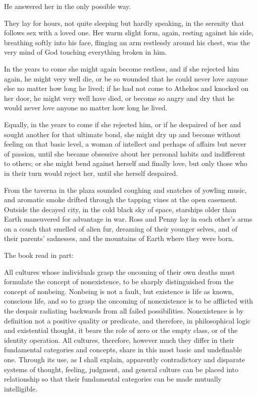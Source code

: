 \documentclass[english,11pt,letterpaper,onecolumn]{scrbook}
\begin{document}
	He answered her in the only possible way.

	They lay for hours, not quite sleeping but hardly speaking, in the serenity that follows sex with a loved one.  Her warm slight form, again, resting against his side, breathing softly into his face, flinging an arm restlessly around his chest, was the very mind of God touching everything broken in him.

	In the years to come she might again become restless, and if she rejected him again, he might very well die, or be so wounded that he could never love anyone else no matter how long he lived; if he had not come to Athekos and knocked on her door, he might very well have died, or become so angry and dry that he would never love anyone no matter how long he lived.

	Equally, in the years to come if she rejected him, or if he despaired of her and sought another for that ultimate bond, she might dry up and become without feeling on that basic level, a woman of intellect and perhaps of affairs but never of passion, until she became obsessive about her personal habits and indifferent to others; or she might bend against herself and finally love, but only those who in their turn would reject her, until she herself despaired.

	From the taverna in the plaza sounded coughing and snatches of yowling music, and aromatic smoke drifted through the tapping vines at the open casement.  Outside the decayed city, in the cold black sky of space, starships older than Earth maneuvered for advantage in war.  Ross and Penny lay in each other's arms on a couch that smelled of alien fur, dreaming of their younger selves, and of their parents' sadnesses, and the mountains of Earth where they were born.  

	The book read in part:

	All cultures whose individuals grasp the oncoming of their own deaths must formulate the concept of nonexistence, to be sharply distinguished from the concept of nonbeing.  Nonbeing is not a fault, but existence is life as known, conscious life, and so to grasp the oncoming of nonexistence is to be afflicted with the despair radiating backwards from all failed possibilities.  Nonexistence is by definition not a positive quality or predicate, and therefore, in philosophical logic and existential thought, it bears the role of zero or the empty class, or of the identity operation.  All cultures, therefore, however much they differ in their fundamental categories and concepts, share in this most basic and undefinable one.  Through its use, as I shall explain, apparently contradictory and disparate systems of thought, feeling, judgment, and general culture can be placed into relationship so that their fundamental categories can be made mutually intelligible.
\end{document}
